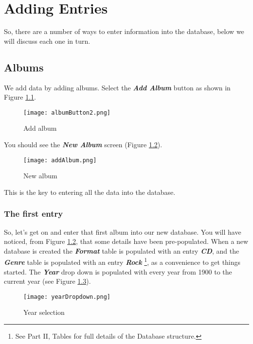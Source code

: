 \chapter{Adding Entries}
So, there are a number of ways to enter information into the database, below we will discuss each one in turn.

\section{Albums}
\label{sect:albums}
We add data by adding albums.  Select the 
\textit{\textbf{Add Album}}
button as shown in Figure 
\ref{fig:Add album}.
\begin{figure}[!ht]
 \centering
 \texttt{[image: albumButton2.png]} 
 \caption{Add album}
 \label{fig:Add album}
\end{figure}

You should see the 
\textit{\textbf{New Album}}
screen (Figure 
\ref{fig:New album}).
\begin{figure}[!ht]
 \centering
 \texttt{[image: addAlbum.png]}
 \caption{New album}
 \label{fig:New album}
\end{figure} 
This is the key to entering all the data into the database.
\newpage

\subsection{The first entry}
So, let's get on and enter that first album into our new database.  You will have noticed, from Figure
\ref{fig:New album},
that some details have been pre-populated.  When a new database is created the 
\textit{\textbf{Format}}
table is populated with an entry 
\textit{\textbf{CD}}, 
and the
\textit{\textbf{Genre}} 
table is populated with an entry 
\textit{\textbf{Rock}} 
\footnote{See Part II, Tables for  full details of the Database structure.},
as a convenience to get things started.  The 
\textit{\textbf{Year}} 
drop down is populated with every year from 1900 to the current year (see Figure 
\ref{fig:Year selection}).
\begin{figure}[!ht]
 \centering
 \texttt{[image: yearDropdown.png]}
 \caption{Year selection}
 \label{fig:Year selection}
\end{figure}

